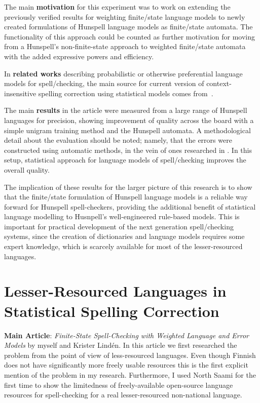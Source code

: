 \documentclass[officiallayout]{unihelcompling}
\begin{document}
The main \textbf{motivation} for this experiment was to work on extending the
previously verified results for weighting finite\-/state language models to newly
created formulations of Hunspell language models as finite\-/state automata. The
functionality of this approach could be counted as further motivation for
moving from a Hunspell's non-finite-state approach to weighted finite\-/state automata with
the added expressive powers and efficiency.

In \textbf{related works} describing probabilistic or otherwise preferential
language models for spell\-/checking, the main source for current version of 
context-insensitive spelling correction using statistical models comes
from~\citet{church1991probability}.

The main \textbf{results} in the article were measured from a large range of
Hunspell languages for precision, showing improvement of quality across the
board with a simple unigram training method and the Hunspell automata. A
methodological detail about the evaluation should be noted; namely, that the errors were
constructed using automatic methods, in the vein of ones researched in
\citep{bigert2003autoeval,bigert2005automatic}. In this setup, statistical approach for language models of spell\-/checking improves
the overall quality.

The implication of these results for the larger picture of this research is to
show that the finite\-/state formulation of Hunspell language models is a
reliable way forward for Hunspell spell-checkers, providing the additional
benefit of statistical language modelling to Husnpell's well-engineered
rule-based models. This is important for practical development of the next
generation spell\-/checking systems, since the creation of dictionaries and
language models requires some expert knowledge, which is scarcely available for
most of the lesser-resourced languages.

\section{Lesser-Resourced Languages in Statistical Spelling Correction}
\label{sec:lesser-training}

\textbf{Main Article}: \emph{Finite-State Spell-Checking with Weighted Language
and Error Models} by myself and Krister Lindén. In this article we first
researched the problem from the point of view of less-resourced languages. Even
though Finnish does not have significantly more freely usable resources this is
the first explicit mention of the problem in my research. Furthermore, I used
North Saami for the first time to show the limitedness of freely-available
open-source language resources for spell-checking for a real lesser-resourced
non-national language.
\end{document}
